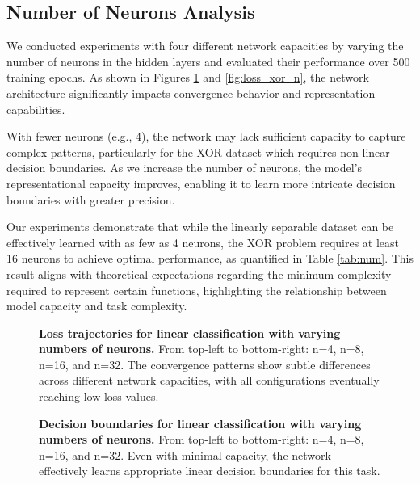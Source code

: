 \documentclass[twocolumn]{extarticle}
\begin{document}
\subsection{Number of Neurons Analysis}
We conducted experiments with four different network capacities by varying the number of neurons in the hidden layers and evaluated their performance over 500 training epochs. As shown in Figures \ref{fig:loss_linear_n} and \ref{fig:loss_xor_n}, the network architecture significantly impacts convergence behavior and representation capabilities.

With fewer neurons (e.g., 4), the network may lack sufficient capacity to capture complex patterns, particularly for the XOR dataset which requires non-linear decision boundaries. As we increase the number of neurons, the model's representational capacity improves, enabling it to learn more intricate decision boundaries with greater precision.

Our experiments demonstrate that while the linearly separable dataset can be effectively learned with as few as 4 neurons, the XOR problem requires at least 16 neurons to achieve optimal performance, as quantified in Table \ref{tab:num}. This result aligns with theoretical expectations regarding the minimum complexity required to represent certain functions, highlighting the relationship between model capacity and task complexity.

\begin{figure}[H]
\caption{\textbf{Loss trajectories for linear classification with varying numbers of neurons.} From top-left to bottom-right: n=4, n=8, n=16, and n=32. The convergence patterns show subtle differences across different network capacities, with all configurations eventually reaching low loss values.}
\label{fig:loss_linear_n}
\end{figure}

\begin{figure}[H]
\caption{\textbf{Decision boundaries for linear classification with varying numbers of neurons.} From top-left to bottom-right: n=4, n=8, n=16, and n=32. Even with minimal capacity, the network effectively learns appropriate linear decision boundaries for this task.}
\label{fig:res_linear_n}
\end{figure}
\end{document}
